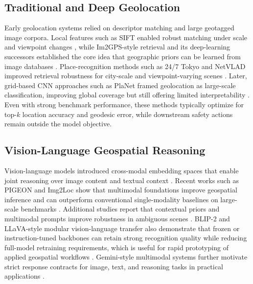 \documentclass[10pt,conference]{IEEEtran}
\begin{document}
\subsection{Traditional and Deep Geolocation}
Early geolocation systems relied on descriptor matching and large geotagged image corpora. Local features such as SIFT enabled robust matching under scale and viewpoint changes \cite{lowe2004distinctive}, while Im2GPS-style retrieval and its deep-learning successors established the core idea that geographic priors can be learned from image databases \cite{wu2022im2city, vo2017revisiting}. Place-recognition methods such as 24/7 Tokyo and NetVLAD improved retrieval robustness for city-scale and viewpoint-varying scenes \cite{torii2015247, arandjelovic2016netvlad}. Later, grid-based CNN approaches such as PlaNet framed geolocation as large-scale classification, improving global coverage but still offering limited interpretability \cite{weyand2016planet}. Even with strong benchmark performance, these methods typically optimize for top-$k$ location accuracy and geodesic error, while downstream safety actions remain outside the model objective.

\subsection{Vision-Language Geospatial Reasoning}
Vision-language models introduced cross-modal embedding spaces that enable joint reasoning over image content and textual context \cite{radford2021clip}. Recent works such as PIGEON and Img2Loc show that multimodal foundations improve geospatial inference and can outperform conventional single-modality baselines on large-scale benchmarks \cite{haas2024pigeon, zhou2024img2loc}. Additional studies report that contextual priors and multimodal prompts improve robustness in ambiguous scenes \cite{wang2024llmgeo, lyu2024tell}. BLIP-2 and LLaVA-style modular vision-language transfer also demonstrate that frozen or instruction-tuned backbones can retain strong recognition quality while reducing full-model retraining requirements, which is useful for rapid prototyping of applied geospatial workflows \cite{li2023blip2, liu2024llava}. Gemini-style multimodal systems further motivate strict response contracts for image, text, and reasoning tasks in practical applications \cite{team2024gemini}.
\end{document}

